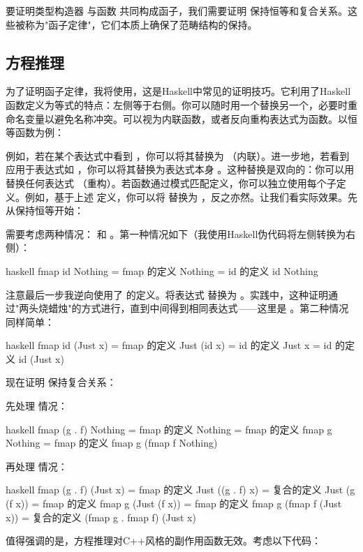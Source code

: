 要证明类型构造器  与函数  共同构成函子，我们需要证明  保持恒等和复合关系。这些被称为"函子定律"，它们本质上确保了范畴结构的保持。

\subsection{方程推理}

为了证明函子定律，我将使用，这是Haskell中常见的证明技巧。它利用了Haskell函数定义为等式的特点：左侧等于右侧。你可以随时用一个替换另一个，必要时重命名变量以避免名称冲突。可以视为内联函数，或者反向重构表达式为函数。以恒等函数为例：

例如，若在某个表达式中看到 ，你可以将其替换为 （内联）。进一步地，若看到  应用于表达式如 ，你可以将其替换为表达式本身 。这种替换是双向的：你可以用  替换任何表达式 （重构）。若函数通过模式匹配定义，你可以独立使用每个子定义。例如，基于上述  定义，你可以将  替换为 ，反之亦然。让我们看实际效果。先从保持恒等开始：

需要考虑两种情况： 和 。第一种情况如下（我使用Haskell伪代码将左侧转换为右侧）：

\begin{snip}{haskell}
  fmap id Nothing
= { fmap 的定义 }
  Nothing
= { id 的定义 }
  id Nothing
\end{snip}
注意最后一步我逆向使用了  的定义。将表达式  替换为 。实践中，这种证明通过"两头烧蜡烛"的方式进行，直到中间得到相同表达式——这里是 。第二种情况同样简单：

\begin{snip}{haskell}
  fmap id (Just x)
= { fmap 的定义 }
  Just (id x)
= { id 的定义 }
  Just x
= { id 的定义 }
  id (Just x)
\end{snip}
现在证明  保持复合关系：

先处理  情况：

\begin{snip}{haskell}
  fmap (g . f) Nothing
= { fmap 的定义 }
  Nothing
= { fmap 的定义 }
  fmap g Nothing
= { fmap 的定义 }
  fmap g (fmap f Nothing)
\end{snip}
再处理  情况：

\begin{snip}{haskell}
  fmap (g . f) (Just x)
= { fmap 的定义 }
  Just ((g . f) x)
= { 复合的定义 }
  Just (g (f x))
= { fmap 的定义 }
  fmap g (Just (f x))
= { fmap 的定义 }
  fmap g (fmap f (Just x))
= { 复合的定义 }
  (fmap g . fmap f) (Just x)
\end{snip}
值得强调的是，方程推理对C++风格的副作用函数无效。考虑以下代码：

